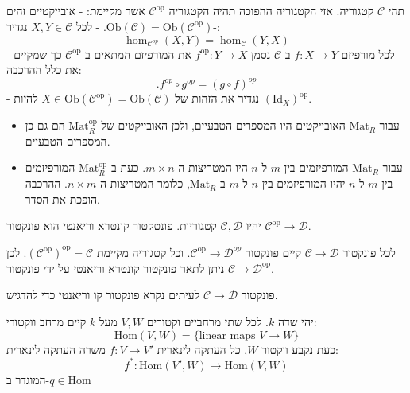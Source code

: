 \documentclass{tstextbook}
\begin{document}
\begin{definition}
תהי \(\mathcal{C}\) קטגוריה. אזי הקטגוריה ההפוכה תהיה הקטגוריה \(\mathcal{C}^{\text{op}}\) אשר מקיימת:
- אובייקטיים זהים -\(\text{Ob}(\mathcal{C})=\text{Ob}(\mathcal{C}^{\text{op}})\).
- לכל \(X,Y\in \mathcal{C}\) נגדיר:
$$\hom_{{\mathcal{C}}^{o p}}\left(X,Y\right)=\hom_{{\mathcal{C}}}\left(Y,X\right)$$
- לכל מורפיזם \(f:X\to Y\) ב-\(\mathcal{C}\) נסמן \(f^{\text{op}}:Y\to X\) את המורפיזם המתאים ב-\(\mathcal{C}^{\text{op}}\) כך שמקיים את כלל ההרכבה:
$$.f^{o p}\circ g^{o p}=(g\circ f)^{o p}$$
- נגדיר את הזהות של \(X \in \mathrm{Ob}(\mathcal{C}^{\text{op}})=\mathrm{Ob}(\mathcal{C})\) להיות \((\mathrm{Id}_{X})^{\text{op}}\).

\end{definition}
\begin{example}
  \begin{itemize}
    \item עבור \(\text{Mat}_{R}\) האובייקטים היו המספרים הטבעיים, ולכן האובייקטים של \(\text{Mat}_{R}^{\text{op}}\) הם גם כן המספרים הטבעיים.
    \item עבור \(\text{Mat}_{R}\) המורפיזמים בין \(m\) ל-\(n\) היו המטריצות ה-\(m\times n\). כעת ב-\(\text{Mat}_{R}^{\text{op}}\) המורפיזמים בין \(m\) ל-\(n\) יהיו המורפיזמים בין \(n\) ל-\(m\) ב-\(\mathrm{Mat}_{R}\), כלומר המטריצות ה-\(n \times m\). ההרכבה הופכת את הסדר.
  \end{itemize}
\end{example}
\begin{definition}
יהיו \(\mathcal{C},\mathcal{D}\) קטגוריות. פונטקטור קונטרא וריאנטי הוא פונקטור \(\mathcal{C}^{\text{op}}\to \mathcal{D}\).

\end{definition}
\begin{remark}
לכל פונקטור \(\mathcal{C}\to \mathcal{D}\) קיים פונקטור \(\mathcal{C}^{\text{op}}\to \mathcal{D}^{op}\). וכל קטגוריה מקיימת \((\mathcal{C}^{\text{op}})^{\text{op}}=\mathcal{C}\). לכן ניתן לתאר פונקטור קונטרא וריאנטי על ידי פונקטור \(\mathcal{C}\to \mathcal{D}^{\text{op}}\).

\end{remark}
\begin{remark}
פונקטור \(\mathcal{C}\to \mathcal{D}\) לעיתים נקרא פונקטור קו וריאנטי כדי להדגיש.

\end{remark}
\begin{example}
יהי שדה \(k\). לכל שתי מרחביים וקטורים \(V,W\) מעל \(k\) קיים מרחב ווקטורי:
$$\mathrm{Hom}(V,W)=\{ \text{linear maps }V \to W\}$$
כעת נקבע ווקטור \(W\), כל העתקה לינארית \(f:V\to V'\) משרה העתקה לינארית:
$$f^{*}:\mathrm{Hom}(V',W)\to \mathrm{Hom}(V,W)$$
המוגדר ב-\(q \in \mathrm{Hom}\)

\end{example}
\begin{definition}
\end{definition}
\end{document}

